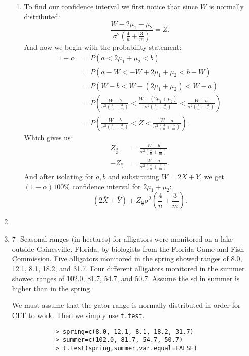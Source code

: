 \documentclass{article}
\begin{document}
\begin{enumerate}
\begin{enumerate}[label= (\alph*)]
        \item To find our confidence interval we first notice that since $W$ is 
            normally distributed:
            \[
        \frac{W-2\mu_1-\mu_2}{\sigma^2\left( \frac{4}{n}+\frac{3}{m} \right) }=Z
        .\]
            And now we begin with the probability statement:
            \begin{align*}
                1-\alpha&=P(a<2\mu_1+\mu_2<b)\\
                    &=P(a-W<-W+2\mu_1+\mu_2<b-W)\\
                    &=P(W-b<W-(2\mu_1+\mu_2)<W-a)\\
                    &= P\left( \frac{W-b}{\sigma^2\left( \frac{4}{n}+\frac{3}{m} \right) }<\frac{W-(2\mu_1+\mu_2)}{\sigma^2\left( \frac{4}{n}+\frac{3}{m} \right) }<\frac{W-a}{\sigma^2\left( \frac{4}{n}+\frac{3}{m} \right) } \right)\\
                    &= P\left( \frac{W-b}{\sigma^2\left( \frac{4}{n}+\frac{3}{m} \right) }<Z<\frac{W-a}{\sigma^2\left( \frac{4}{n}+\frac{3}{m} \right) } \right)
            .\end{align*}
            Which gives us:
            \begin{align*}
                Z_{\frac{\alpha}{2}}&=\frac{W-b}{\sigma^2\left( \frac{4}{n}+\frac{3}{m} \right) }\\
                -Z_{\frac{\alpha}{2}}&=\frac{W-a}{\sigma^2\left( \frac{4}{n}+\frac{3}{m} \right) }
            .\end{align*}
            And after isolating for $a,b$ and substituting $W=2\bar{X}+\bar{Y}$,
            we get $(1-\alpha)100\%$ confidence interval for $2\mu_1+\mu_2$:
            \[
                (2\bar{X}+\bar{Y})\pm Z_{\frac{\alpha}{2}}\sigma^2\left( \frac{4}{n}+\frac{3}{m} \right) 
            .\] 
        \end{enumerate}
    \item 
    \item 7- 
        Seasonal ranges (in hectares) for alligators were monitored on a lake outside Gainesville, Florida, by biologists
        from the Florida Game and Fish Commission. Five alligators monitored in the spring showed ranges of 8.0,
        12.1, 8.1, 18.2, and 31.7. Four different alligators monitored in the summer showed ranges of 102.0, 81.7,
        54.7, and 50.7.
        Assume the sd in summer is higher than in the spring.


        We must assume that the gator range is normally distributed in order for CLT to work.
        Then we simply use \verb|t.test|.
        \begin{verbatim}
            > spring=c(8.0, 12.1, 8.1, 18.2, 31.7)
            > summer=c(102.0, 81.7, 54.7, 50.7)
            > t.test(spring,summer,var.equal=FALSE)
        \end{verbatim}


\end{enumerate}
\end{document}
